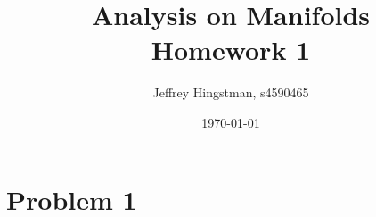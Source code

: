 \documentclass[a4paper, 12pt]{article}
\begin{document}
	\title{Analysis on Manifolds \\[0.5cm] \large{Homework 1}} 
	\date{\today}
	\author{Jeffrey Hingstman, s4590465}	\maketitle
	
	\clearpage
	\section*{Problem 1}
	
\end{document}
